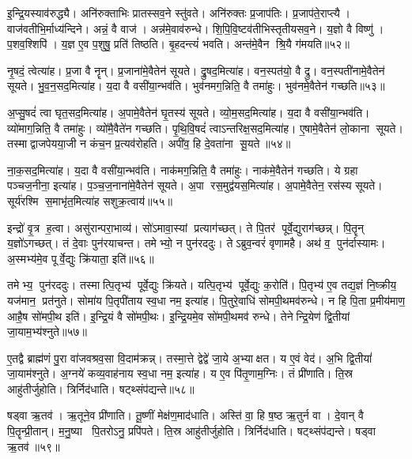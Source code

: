 इ॒न्द्रि॒यस्याव॑रुद्ध्यै। अनि॑रुक्ताभिः प्रातस्सव॒ने स्तु॑वते। अनि॑रुक्तः प्र॒जाप॑तिः। प्र॒जाप॑ते॒राप्त्यै। वाज॑वतीभि॒र्माध्य॑न्दिने। अन्नं॒ वै वाज॑। अन्न॑मे॒वाव॑रुन्धे। शि॒पि॒वि॒ष्टव॑तीभिस्तृतीयसव॒ने। य॒ज्ञो वै विष्णु॑। प॒शव॒श्शिपि॑। य॒ज्ञ ए॒व प॒शुषु॒ प्रति॑ तिष्ठति। बृ॒हदन्त्यं॑ भवति। अन्त॑मे॒वैन श्रि॒यै ग॑मयति॥५२॥\anuvakamend[अ॒श्नी॒यादन्न॑स्यान्न॒स्याव॑रुद्ध्या॒ इन्द्र॑स्य त्वा॒ साम्राज्येना॒भिषि॑ञ्चा॒मीत्या॑ह वाज॒सृत॒श्शिपि॒स्त्रीणि॑ च]

नृ॒षदं॒ त्वेत्या॑ह। प्र॒जा वै नॄन्। प्र॒जाना॑मे॒वैतेन॑ सूयते। द्रु॒षद॒मित्या॑ह। वन॒स्पत॑यो॒ वै द्रु। वन॒स्पती॑नामे॒वैतेन॑ सूयते। भु॒व॒न॒सद॒मित्या॑ह। य॒दा वै वसी॑या॒न्भव॑ति। भुव॑नमग॒न्निति॒ वै तमा॑हुः। भुव॑नमे॒वैतेन॑ गच्छति॥५३॥

अ॒प्सु॒षदं॑ त्वा घृत॒सद॒मित्या॑ह। अ॒पामे॒वैतेन॑ घृ॒तस्य॑ सूयते। व्यो॒म॒सद॒मित्या॑ह। य॒दा वै वसी॑या॒न्भव॑ति। व्यो॑माग॒न्निति॒ वै तमा॑हुः। व्यो॑मै॒वैते॑न गच्छति। पृ॒थि॒वि॒षदं॑ त्वाऽन्तरिक्ष॒सद॒मित्या॑ह। ए॒षामे॒वैतेन॑ लो॒काना सूयते। तस्माद्वाजपेयया॒जी न कंच॒न प्र॒त्यव॑रोहति। अपी॑व॒ हि दे॒वता॑ना सू॒यते॥५४॥

ना॒क॒सद॒मित्या॑ह। य॒दा वै वसी॑या॒न्भव॑ति। नाक॑मग॒न्निति॒ वै तमा॑हुः। नाक॑मे॒वैतेन॑ गच्छति। ये ग्रहा पञ्चज॒नीना॒ इत्या॑ह। प॒ञ्च॒ज॒नाना॑मे॒वैतेन॑ सूयते। अ॒पा रस॒मुद्व॑यस॒मित्या॑ह। अ॒पामे॒वैतेन॒ रस॑स्य सूयते। सूर्य॑रश्मि स॒माभृ॑त॒मित्या॑ह सशुक्र॒त्वाय॑॥५५॥\anuvakamend[ग॒च्छ॒ति॒ सू॒यते॒ नव॑ च]

इन्द्रो॑ वृ॒त्र ह॒त्वा। असु॑रान्परा॒भाव्य॑। सो॑ऽमावा॒स्यां प्रत्याग॑च्छत्। ते पि॒तर॑ पूर्वे॒द्युराग॑च्छन्न्। पि॒तॄन् य॒ज्ञो॑ऽगच्छत्। तं दे॒वाः पुन॑रयाचन्त। तमेभ्यो॒ न पुन॑रददुः। तेऽब्रुव॒न्वरं॑ वृणामहै। अथ॑ व॒ पुन॑र्दास्यामः। अ॒स्मभ्य॑मे॒व पूर्वे॒द्युः क्रि॑याता॒ इति॑॥५६॥

तमेभ्य॒ पुन॑रददुः। तस्मात्पि॒तृभ्य॑ पूर्वे॒द्युः क्रि॑यते। यत्पि॒तृभ्य॑ पूर्वे॒द्युः क॒रोति॑। पि॒तृभ्य॑ ए॒व तद्य॒ज्ञं नि॒ष्क्रीय॒ यज॑मान॒ प्रत॑नुते। सोमा॑य पि॒तृपी॑ताय स्व॒धा नम॒ इत्या॑ह। पि॒तुरे॒वाधि॑ सोमपी॒थमव॑रुन्धे। न हि पि॒ता प्र॒मीय॑माण॒ आहै॒ष सो॑मपी॒थ इति॑। इ॒न्द्रि॒यं वै सो॑मपी॒थः। इ॒न्द्रि॒यमे॒व सो॑मपी॒थमव॑ रुन्धे। तेनेन्द्रि॒येण॑ द्वि॒तीयां जा॒याम॒भ्य॑श्नुते॥५७॥

ए॒तद्वै ब्राह्म॑णं पु॒रा वा॑जवश्रव॒सा वि॒दाम॑क्रन्न्। तस्मा॒त्ते द्वेद्वे॑ जा॒ये अ॒भ्याक्षत। य ए॒वं वेद॑। अ॒भि द्वि॒तीयां॑ जा॒याम॑श्नुते। अ॒ग्नये॑ कव्य॒वाह॑नाय स्व॒धा नम॒ इत्या॑ह। य ए॒व पि॑तृ॒णाम॒ग्निः। तं प्री॑णाति। ति॒स्र आहु॑तीर्जुहोति। त्रिर्निद॑धाति। षट्थ्संप॑द्यन्ते॥५८॥

षड्वा ऋ॒तव॑। ऋ॒तूने॒व प्री॑णाति। तू॒ष्णीं मेक्ष॑ण॒माद॑धाति। अस्ति॑ वा॒ हि ष॒ष्ठ ऋ॒तुर्न वा। दे॒वान् वै पि॒तॄन्प्री॒तान्। म॒नु॒ष्या पि॒तरोऽनु॒ प्रपि॑पते। ति॒स्र आहु॑तीर्जुहोति। त्रिर्निद॑धाति। षट्थ्संप॑द्यन्ते। षड्वा ऋ॒तव॑॥५९॥

